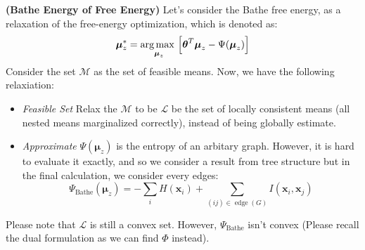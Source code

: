 \begin{remark}{\textbf{(Bathe Energy of Free Energy)}}
    Let's consider the Bathe free energy, as a relaxation of the free-energy optimization, which is denoted as:
    \begin{equation*}
        \boldsymbol \mu^*_z = \underset{\boldsymbol \mu_z}{\arg\max \ }\Big[ \boldsymbol \theta^T\boldsymbol \mu_z - \Psi(\boldsymbol \mu_z) \Big]
    \end{equation*}
    Consider the set $\mathcal{M}$ as the set of feasible means. Now, we have the following relaxiation:
    \begin{itemize}
        \item \emph{Feasible Set} Relax the $\mathcal{M}$ to be $\mathcal{L}$ be the set of locally consistent means (all nested means marginalized correctly), instead of being globally estimate.
        \item \emph{Approximate} $\Psi(\boldsymbol \mu_z)$ is the entropy of an arbitary graph. However, it is hard to evaluate it exactly, and so we consider a result from tree structure but in the final calculation, we consider every edges:
        \begin{equation*}
            \Psi_\text{Bathe}(\boldsymbol \mu_z) = -\sum_iH(\boldsymbol x_i) +\sum_{(ij)\in\operatorname{edge}(G)}I(\boldsymbol x_i, \boldsymbol x_j)
        \end{equation*}
    \end{itemize}
    Please note that $\mathcal{L}$ is still a convex set. However, $\Psi_\text{Bathe}$ isn't convex (Please recall the dual formulation as we can find $\Phi$ instead). 
\end{remark}

